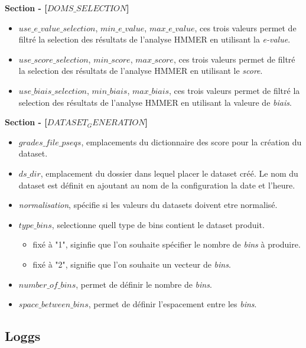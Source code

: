 \textbf{Section - [$DOMS\_SELECTION$]}


\begin{itemize}
\item \emph{$use\_e\_value\_selection$}, \emph{$min\_e\_value$}, \emph{$max\_e\_value$}, ces trois valeurs permet de filtré la selection des résultats de l'analyse HMMER en utilisant la \emph{e-value}.
\item \emph{$use\_score\_selection$}, \emph{$min\_score$}, \emph{$max\_score$}, ces trois valeurs permet de filtré la selection des résultats de l'analyse HMMER en utilisant le \emph{score}.
\item \emph{$use\_biais\_selection$}, \emph{$min\_biais$}, \emph{$max\_biais$}, ces trois valeurs permet de filtré la selection des résultats de l'analyse HMMER en utilisant la valeure de  \emph{biais}.
\end{itemize}

\textbf{Section - [$DATASET_GENERATION$]}

\begin{itemize}
\item \emph{$grades\_file\_pseqs$}, emplacements du dictionnaire des score pour la création du dataset.
\item \emph{$ds\_dir$}, emplacement du dossier dans lequel placer le dataset créé. Le nom du dataset est définit en ajoutant au nom de la configuration la date et l'heure.
\item \emph{normalisation}, spécifie si les valeurs du datasets doivent etre normalisé.
\item \emph{$type\_bins$}, selectionne quell type de bins contient le dataset produit.
\begin{itemize}
\item fixé à "1", siginfie que l'on souhaite spécifier le nombre de \emph{bins} à produire.
\item fixé à "2", signifie que l'on souhaite un vecteur de \emph{bins}.
\end{itemize}
\item \emph{$number\_of\_bins$}, permet de définir le nombre de \emph{bins}.
\item \emph{$space\_between\_bins$}, permet de définir l'espacement entre les \emph{bins}.
\end{itemize}

\subsection{Loggs}















































